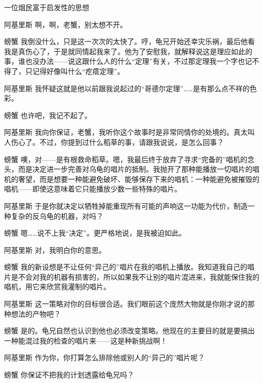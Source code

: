 \begin{dialog}{一位烟民富于启发性的思想}
\begin{dialogue}
\item[阿基里斯]啊，啊，老蟹，别太想不开。

\item[螃蟹]我倒没什么，只是这一次次的太快了。哼，龟兄开始还幸灾乐祸，最后他看我是真伤心了，于是就同情起我来了。他为了安慰我，就解释说这是理应如此的事，谁也没办法——说这跟什么人的什么“定理”有关，不过那定理我一个字也记不得了，只记得好像叫什么“疙瘩定理”。

\item[阿基里斯]我怀疑这就是他以前跟我说起过的“哥德尔定理”……是有那么点不祥的色彩。

\item[螃蟹]也许吧，我记不起了。

\item[阿基里斯]我向你保证，老蟹，我听你这个故事时是非常同情你的处境的。真太叫人伤心了。不过，你提到过什么稻草的事，请跟我说说，是怎么回事？

\item[螃蟹]噢，对——是有根救命稻草。嗯，我最后终于放弃了寻求“完备的”唱机的念头，而是决定进一步完善对乌龟的唱片的抵制。我抛开了那种能播放一切唱片的唱机的奢望，而是想要一种能避免破坏、能够保存下来的唱机：一种能避免被摧毁的唱机——即使这意味着它只能播放少数一些特殊的唱片。

\item[阿基里斯]于是你就决定以牺牲掉能重现所有可能的声响这一功能为代价，制造一种复杂的反乌龟的机器，对吗？

\item[螃蟹]嗯……说不上我“决定”。更严格地说，是我被迫如此。

\item[阿基里斯]对，我明白你的意思。

\item[螃蟹]我的新设想是不让任何“异己的”唱片在我的唱机上播放。我知道我自己的唱片是不会对我的机器有损害的，所以如果我不让别的唱片混进来，我就能保住我的唱机，用它来欣赏我灌制的唱片。

\item[阿基里斯]这一策略对你的目标很合适。我们眼前这个庞然大物就是你刚才说的那种想法的产物吧？

\item[螃蟹]是的。龟兄自然也认识到他也必须改变策略。他现在的主要目的就是要搞出一种能混过我的检查的唱片来——这是种新挑战啊！

\item[阿基里斯]作为你，你打算怎么排除他或别人的“异己的”唱片呢？

\item[螃蟹]你保证不把我的计划透露给龟兄吗？


\end{dialogue}
\end{dialog}
